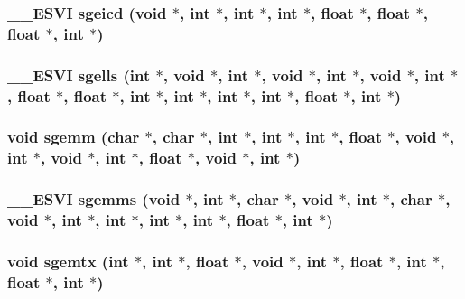 \subsubsection{\setlength{\rightskip}{0pt plus 5cm}\_\-\_\-ESVI sgeicd (void $\ast$, int $\ast$, int $\ast$, int $\ast$, float $\ast$, float $\ast$, float $\ast$, int $\ast$)}\label{essl_8h_214ea677c46b3232bda452b69ebecd07}


\subsubsection{\setlength{\rightskip}{0pt plus 5cm}\_\-\_\-ESVI sgells (int $\ast$, void $\ast$, int $\ast$, void $\ast$, int $\ast$, void $\ast$, int $\ast$, float $\ast$, float $\ast$, int $\ast$, int $\ast$, int $\ast$, int $\ast$, float $\ast$, int $\ast$)}\label{essl_8h_233fdbfca4b4704cbed4af0b9252e75b}


\subsubsection{\setlength{\rightskip}{0pt plus 5cm}void sgemm (char $\ast$, char $\ast$, int $\ast$, int $\ast$, int $\ast$, float $\ast$, void $\ast$, int $\ast$, void $\ast$, int $\ast$, float $\ast$, void $\ast$, int $\ast$)}\label{essl_8h_1c0623b7b66e286b206b03d490ea242e}


\subsubsection{\setlength{\rightskip}{0pt plus 5cm}\_\-\_\-ESVI sgemms (void $\ast$, int $\ast$, char $\ast$, void $\ast$, int $\ast$, char $\ast$, void $\ast$, int $\ast$, int $\ast$, int $\ast$, int $\ast$, float $\ast$, int $\ast$)}\label{essl_8h_878edbdb34bb95e55d93dad09f2d48b7}


\subsubsection{\setlength{\rightskip}{0pt plus 5cm}void sgemtx (int $\ast$, int $\ast$, float $\ast$, void $\ast$, int $\ast$, float $\ast$, int $\ast$, float $\ast$, int $\ast$)}\label{essl_8h_086f8b86418b9f275eb3c4258487f70e}


